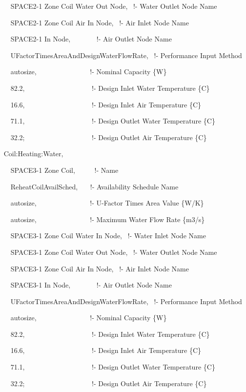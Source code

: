 ~~~ SPACE2-1 Zone Coil Water Out Node,~ !- Water Outlet Node Name

~~~ SPACE2-1 Zone Coil Air In Node,~ !- Air Inlet Node Name

~~~ SPACE2-1 In Node,~~~~~~~ !- Air Outlet Node Name

~~~ UFactorTimesAreaAndDesignWaterFlowRate,~ !- Performance Input Method

~~~ autosize,~~~~~~~~~~~~~~~ !- Nominal Capacity \{W\}

~~~ 82.2,~~~~~~~~~~~~~~~~~~~ !- Design Inlet Water Temperature \{C\}

~~~ 16.6,~~~~~~~~~~~~~~~~~~~ !- Design Inlet Air Temperature \{C\}

~~~ 71.1,~ ~~~~~~~~~~~~~~~~~~!- Design Outlet Water Temperature \{C\}

~~~ 32.2;~~~~~~~~~~~~~~~~~~~ !- Design Outlet Air Temperature \{C\}

~ Coil:Heating:Water,

~~~ SPACE3-1 Zone Coil,~~~~~ !- Name

~~~ ReheatCoilAvailSched,~~~ !- Availability Schedule Name

~~~ autosize, ~~~~~~~~~~~~~~~!- U-Factor Times Area Value \{W/K\}

~~~ autosize,~~~~~~~~~~~~~~~ !- Maximum Water Flow Rate \{m3/s\}

~~~ SPACE3-1 Zone Coil Water In Node,~ !- Water Inlet Node Name

~~~ SPACE3-1 Zone Coil Water Out Node,~ !- Water Outlet Node Name

~~~ SPACE3-1 Zone Coil Air In Node,~ !- Air Inlet Node Name

~~~ SPACE3-1 In Node,~~~~~~~ !- Air Outlet Node Name

~~~ UFactorTimesAreaAndDesignWaterFlowRate,~ !- Performance Input Method

~~~ autosize,~~~~~~~~~~~~~~~ !- Nominal Capacity \{W\}

~~~ 82.2,~~~~~~~~~~~~~~~~~~~ !- Design Inlet Water Temperature \{C\}

~~~ 16.6,~~~~~~~~~~~~~~~~~~~ !- Design Inlet Air Temperature \{C\}

~~~ 71.1,~~~~~~~~~~~~~~~~~~~ !- Design Outlet Water Temperature \{C\}

~~~ 32.2;~~~~~~~~~~~~~~~~~~~ !- Design Outlet Air Temperature \{C\}

